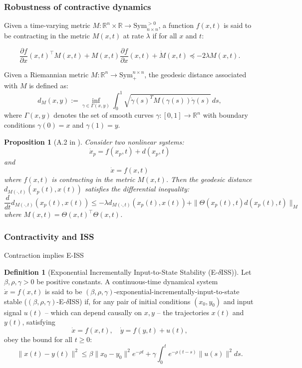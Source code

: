 \documentclass{article}
\newtheorem{proposition}{Proposition}
\theoremstyle{definition} \newtheorem{definition}{Definition}
\theoremstyle{remark} \newtheorem{remark}{Remark}
\newcounter{ct}
\begin{document}
\subsubsection{Robustness of contractive dynamics}\label{sec:contractive_robustness}

Given a time-varying metric \( M : \mathbb{R}^n \times \mathbb{R} \to \text{Sym}_{n \times n}^{>0} \), a function \( f(x,t) \) is said to be contracting in the metric \( M(x,t) \) at rate \( \lambda \) if for all \( x \) and \( t \):

\[
\frac{\partial f}{\partial x} (x,t)^{\top} M(x,t) + M(x,t) \frac{\partial f}{\partial x} (x,t) + \dot{M} (x,t) \preceq -2\lambda M(x,t).
\]


Given a Riemannian metric \( M: \mathbb{R}^n \to \text{Sym}_{+}^{n \times n} \), the geodesic distance associated with \( M \) is defined as:
\begin{equation}
    d_M(x, y) := \inf_{\gamma \in \Gamma(x,y)} \int_0^1 \sqrt{\dot{\gamma}(s)^T M(\gamma(s)) \dot{\gamma}(s)} \, ds,
\end{equation}
where \( \Gamma(x,y) \) denotes the set of smooth curves \( \gamma: [0,1] \to \mathbb{R}^n \) with boundary conditions \( \gamma(0) = x \) and \( \gamma(1) = y \).


\begin{proposition}[A.2 in \citep{zhang2022adversarially}]
Consider two nonlinear systems:
\[
\dot{x}_p = f(x_p, t) + d(x_p, t)
\]
and 
\[
\dot{x} = f(x, t)
\]
where \( f(x, t) \) is contracting in the metric \( M(x,t) \).
 Then the geodesic distance \( d_{M(\cdot,t)}(x_p(t), x(t)) \) satisfies the differential inequality:
\[
\frac{d}{dt} d_{M(\cdot,t)}(x_p(t), x(t)) \leq -\lambda d_{M(\cdot,t)}(x_p(t), x(t)) + \|\Theta(x_p(t),t)d(x_p(t), t)\|_M
\]
where \( M(x,t) = \Theta(x,t)^\top \Theta(x,t) \).
\end{proposition}



\subsubsection{Contractivity and ISS}
Contraction implies E-ISS \citep{zhang2022adversarially}

\begin{definition}[Exponential Incrementally Input-to-State Stability (E-$\delta$ISS)]
Let \( \beta, \rho, \gamma > 0 \) be positive constants.
A continuous-time dynamical system  
\(\dot{x} = f(x, t)\)
is said to be \((\beta, \rho, \gamma)\)-exponential-incrementally-input-to-state stable (\((\beta, \rho, \gamma)\)-E-$\delta$ISS) if, for any pair of initial conditions \( (x_0, y_0) \) and input signal \( u(t) \) – which can depend causally on \( x, y \) – the trajectories \( x(t) \) and \( y(t) \), satisfying  
\[
\dot{x} = f(x, t), \quad \dot{y} = f(y, t) + u(t),
\]
obey the bound for all \( t \geq 0 \):
\[
\| x(t) - y(t) \|^2 \leq  \beta \| x_0 - y_0 \|^2 e^{- \rho t} + \gamma \int_0^t e^{-\rho (t-s)} \| u(s) \|^2 ds.
\]
\end{definition}
\end{document}
